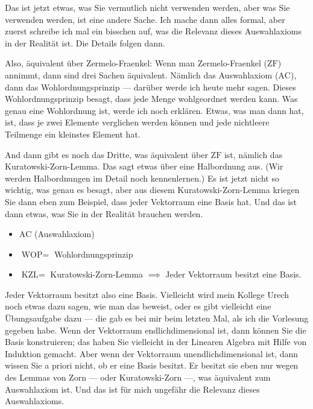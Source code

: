 \begin{spoken-clean}[00:07:30 - 00:09:45]
Das ist jetzt etwas, was Sie vermutlich nicht verwenden werden, aber was Sie verwenden werden, ist eine andere Sache. Ich mache dann alles formal, aber zuerst schreibe ich mal ein bisschen auf, was die Relevanz dieses Auswahlaxioms in der Realität ist. Die Details folgen dann. 

Also, äquivalent über Zermelo-Fraenkel: Wenn man Zermelo-Fraenkel ($\text{ZF}$) annimmt, dann sind drei Sachen äquivalent. Nämlich das Auswahlaxiom ($\text{AC}$), dann das Wohlordnungsprinzip --- darüber werde ich heute mehr sagen. Dieses Wohlordnungsprinzip besagt, dass jede Menge wohlgeordnet werden kann. Was genau eine Wohlordnung ist, werde ich noch erklären. Etwas, was man dann hat, ist, dass je zwei Elemente verglichen werden können und jede nichtleere Teilmenge ein kleinstes Element hat. 

And dann gibt es noch das Dritte, was äquivalent über $\text{ZF}$ ist, nämlich das Kuratowski-Zorn-Lemma. Das sagt etwas über eine Halbordnung aus. (Wir werden Halbordnungen im Detail noch kennenlernen.) Es ist jetzt nicht so wichtig, was genau es besagt, aber aus diesem Kuratowski-Zorn-Lemma kriegen Sie dann eben zum Beispiel, dass jeder Vektorraum eine Basis hat. Und das ist dann etwas, was Sie in der Realität brauchen werden. 
\end{spoken-clean}

\begin{math-stroke}
\begin{itemize}
    \item $\text{AC}$ (Auswahlaxiom)
    \item $\text{WOP} =$ Wohlordnungsprinzip
    \item $\text{KZL} =$ Kuratowski-Zorn-Lemma $\implies$ Jeder Vektorraum besitzt eine Basis.
\end{itemize}
\end{math-stroke}

\begin{spoken-clean}[00:09:45 - 00:10:15]
Jeder Vektorraum besitzt also eine Basis. Vielleicht wird mein Kollege Urech noch etwas dazu sagen, wie man das beweist, oder es gibt vielleicht eine Übungsaufgabe dazu --- die gab es bei mir beim letzten Mal, als ich die Vorlesung gegeben habe. Wenn der Vektorraum endlichdimensional ist, dann können Sie die Basis konstruieren; das haben Sie vielleicht in der Linearen Algebra mit Hilfe von Induktion gemacht. Aber wenn der Vektorraum unendlichdimensional ist, dann wissen Sie a priori nicht, ob er eine Basis besitzt. Er besitzt sie eben nur wegen des Lemmas von Zorn --- oder Kuratowski-Zorn ---, was äquivalent zum Auswahlaxiom ist. Und das ist für mich ungefähr die Relevanz dieses Auswahlaxioms.
\end{spoken-clean}

